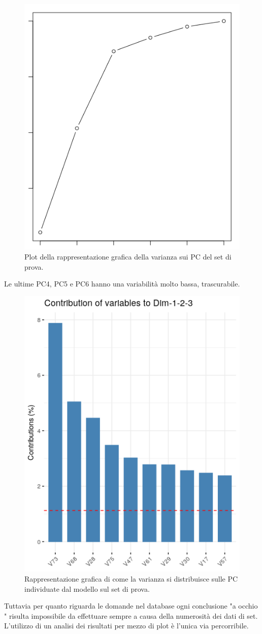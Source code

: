 \begin{figure}[H]
\centering
	\includegraphics[width=0.60\linewidth]{../../PCA/plot/variances2_rete-prova.png}
	\caption{Plot della rappresentazione grafica della varianza sui PC del set di prova.}
	\label{Plot della rappresentazione grafica della varianza sui PC del set di prova.}
\end{figure}
\noindent
Le ultime PC4, PC5 e PC6 hanno una variabilit\`a molto bassa, trascurabile.
\begin{figure}[H]
\centering
	\includegraphics[width=0.60\linewidth]{../../PCA/plot/varianza-complessiva_rete-prova.png}
	\caption{Rappresentazione grafica di come la varianza si distribuisce sulle PC individuate dal modello sul set di prova.}
		\label{Rappresentazione grafica di come la varianza si distribuisce sulle PC individuate dal modello sul set di prova.}
\end{figure}
\noindent
Tuttavia per quanto riguarda le domande nel database ogni conclusione "a occhio " risulta  impossibile da effettuare sempre a causa della numerosit\`a dei dati di set. L'utilizzo di un analisi dei risultati per mezzo di plot \`e l'unica via percorribile.

